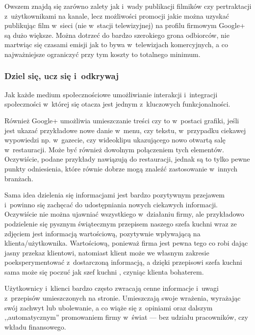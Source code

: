 Owszem znajdą się zarówno zalety jak i~wady publikacji filmików czy pertraktacji z~użytkownikami na kanale, lecz możliwości promocji jakie można uzyskać publikując film w~sieci (nie w~stacji telewizyjnej) na profilu firmowym Google+ są dużo większe. Można dotrzeć do bardzo szerokiego grona odbiorców, nie martwiąc się czasami emisji jak to bywa w~telewizjach komercyjnych, a co najważniejsze ograniczyć przy tym koszty to totalnego minimum.


\subsubsection{Dziel się, ucz się i~odkrywaj}
Jak każde medium społecznościowe umożliwianie interakcji i~integracji społeczności w~której się otacza jest jednym z~kluczowych funkcjonalności. 

Również Google+ umożliwia umieszczanie treści czy to w~postaci grafiki, jeśli jest ukazać przykładowe nowe danie w~menu, czy tekstu, w~przypadku ciekawej wypowiedzi np. w~gazecie, czy wideoklipu ukazującego nowo otwartą salę w~restauracji. Może być również dowolnym połączeniem tych elementów. Oczywiście, podane przykłady nawiązują do restauracji, jednak są to tylko pewne punkty odniesienia, które równie dobrze mogą znaleźć zastosowanie w~innych branżach.

Sama idea dzielenia się informacjami jest bardzo pozytywnym przejawem i~powinno się zachęcać do udostępniania nowych ciekawych informacji. Oczywiście nie można ujawniać wszystkiego w~działaniu firmy, ale przykładowo podzielenie się pysznym świątecznym przepisem naszego szefa kuchni wraz ze zdjęciem jest informacją wartościową, pozytywnie wpływającą na klienta/użytkownika. Wartościową, ponieważ firma jest pewna tego co robi dając jasny przekaz klientowi, natomiast klient może we własnym zakresie poeksperymentować z~dostarczoną informacją, a dzięki przepisowi szefa kuchni sama może się poczuć jak szef kuchni \cite[s.101]{Brogan12}, czyniąc klienta bohaterem.

Użytkownicy i~klienci bardzo często zwracają cenne informacje i~uwagi z~przepisów umieszczonych na stronie. Umieszczają swoje wrażenia, wyrażając swój zachwyt lub ubolewanie, a co wiąże się z~opiniami oraz dalszym ,,automatycznym'' promowaniem firmy w~świat --- bez udziału pracowników, czy wkładu finansowego.


